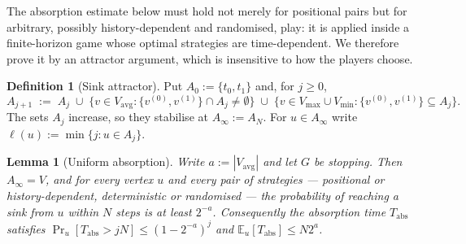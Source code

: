 \documentclass[11pt]{article}
\theoremstyle{plain}
\newtheorem{lemma}[theorem]{Lemma}
\theoremstyle{definition}
\newtheorem{definition}[theorem]{Definition}
\newcommand{\Vmax}{V_{\max}}
\newcommand{\Vmin}{V_{\min}}
\newcommand{\Vavg}{V_{\mathrm{avg}}}
\begin{document}
The absorption estimate below must hold not merely for positional pairs
but for arbitrary, possibly history-dependent and randomised, play: it is
applied inside a finite-horizon game whose optimal strategies are
time-dependent. We therefore prove it by an attractor argument, which is
insensitive to how the players choose.

\begin{definition}[Sink attractor]\label{def:attractor}
Put $A_0:=\{t_0,t_1\}$ and, for $j\ge0$,
\[
  A_{j+1}\;:=\;A_j\;\cup\;\bigl\{v\in\Vavg:\{v^{(0)},v^{(1)}\}\cap A_j\ne\emptyset\bigr\}
  \;\cup\;\bigl\{v\in\Vmax\cup\Vmin:\{v^{(0)},v^{(1)}\}\subseteq A_j\bigr\}.
\]
The sets $A_j$ increase, so they stabilise at $A_\infty:=A_{N}$. For
$u\in A_\infty$ write $\ell(u):=\min\{j:u\in A_j\}$.
\end{definition}

\begin{lemma}[Uniform absorption]\label{lem:absorption}
Write $a:=|\Vavg|$ and let $G$ be stopping. Then $A_\infty=V$, and for
every vertex $u$ and \emph{every} pair of strategies --- positional or
history-dependent, deterministic or randomised --- the probability of
reaching a sink from $u$ within $N$ steps is at least $2^{-a}$.
Consequently the absorption time $T_{\mathrm{abs}}$ satisfies
$\Pr_u[T_{\mathrm{abs}}>jN]\le(1-2^{-a})^j$ and
$\mathbb{E}_u[T_{\mathrm{abs}}]\le N2^{a}$.
\end{lemma}
\end{document}

